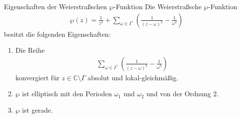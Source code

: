 
\begin{bla}{Eigenschaften der Weierstraßschen $\wp$-Funktion}\label{3.5}
Die Weierstraßsche $\wp$-Funktion 
\begin{align*}
\wp(z) =\frac{1}{z^2} + \sum \limits_{\omega \in \Gamma^\prime} \left( \frac{1}{(z-\omega)^2} - \frac{1}{\omega^2} \right)
\end{align*}
besitzt die folgenden Eigenschaften:
\begin{enumerate}%
\item[\textbf{(1)}]
Die Reihe 
\begin{align*}
\sum \limits_{\omega \in \Gamma^\prime} \left( \frac{1}{(z-\omega)^2} - \frac{1}{\omega^2} \right)
\end{align*}
konvergiert für $z \in \mathbb{C} \setminus \Gamma$ absolut und lokal-gleichmäßig.
\item[\textbf{(2)}]
$\wp $ ist elliptisch mit den Perioden $\omega_1$ und $\omega_2$ und von der Ordnung 2.
\item[\textbf{(3)}]
$\wp$ ist gerade.
\end{enumerate}
\end{bla}

